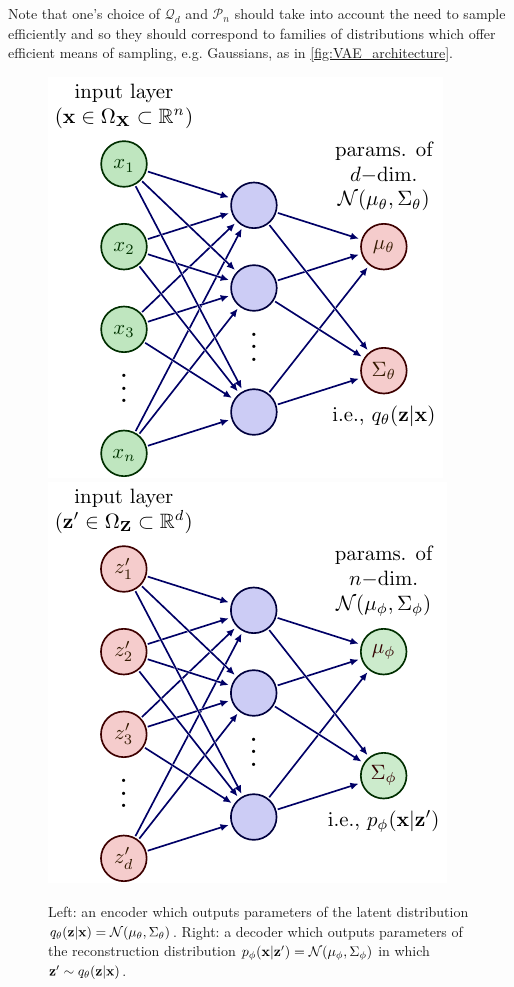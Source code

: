 \documentclass[11pt]{article}
\begin{document}
Note that one's choice of $\mathcal{Q}_d$ and $\mathcal{P}_n$ should take into account the need to sample efficiently and so they should correspond to families of distributions which offer efficient means of sampling, e.g. Gaussians, as in \autoref{fig:VAE_architecture}.

\begin{figure}
    \centering
    \includegraphics[width=0.46\linewidth]{figures/generative_models/VAE_encoder.pdf}
    \hspace{20pt}
    \includegraphics[width=0.46\linewidth]{figures/generative_models/VAE_decoder.pdf}
    \caption{Left: an encoder which outputs parameters of the latent distribution $q_{\theta}(\mathbf{z}|\mathbf{x})=\mathcal{N}(\mu_{\theta},\Sigma_{\theta})$. Right: a decoder which outputs parameters of the reconstruction distribution $p_{\phi}(\mathbf{x}|\mathbf{z}')=\mathcal{N}(\mu_{\phi},\Sigma_{\phi})$ in which $\mathbf{z}'\sim q_{\theta}(\mathbf{z}|\mathbf{x})$.}
    \label{fig:VAE_architecture}
\end{figure}
\end{document}
